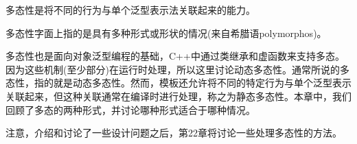 多态性是将不同的行为与单个泛型表示法关联起来的能力。

\begin{notice}多态性字面上指的是具有多种形式或形状的情况(来自希腊语polymorphos)。
\end{notice}

多态性也是面向对象泛型编程的基础，C++中通过类继承和虚函数来支持多态。因为这些机制(至少部分)在运行时处理，所以这里讨论动态多态性。通常所说的多态性，指的就是动态多态性。然而，模板还允许将不同的特定行为与单个泛型表示关联起来，但这种关联通常在编译时进行处理，称之为静态多态性。本章中，我们回顾了多态的两种形式，并讨论哪种形式适合于哪种情况。

注意，介绍和讨论了一些设计问题之后，第22章将讨论一些处理多态性的方法。